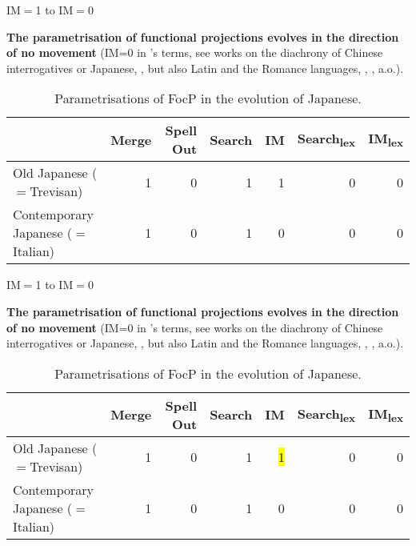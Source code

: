 \documentclass[lesson_slides]{subfiles}
\begin{document}
\begin{frame}[c]{IM$=$1 to IM$=$0}

    \textbf{The parametrisation of functional projections evolves in the direction of no movement} (IM=0 in \citeauthor{rizzi2017}’s \citeyear{rizzi2017} terms, see works on the diachrony of Chinese interrogatives \citealt{aldridge2010clause} or Japanese, \citealt{aldridge2009old}, but also Latin and the Romance languages, \citealt{roberts2003syntactic}, \citealt{dadan2019}, a.o.). \pause
    
    \begin{table}[ht]
        \centering
        \begin{tabular}{|l|r|r|r|r|r|r|}
        \hline
         & Merge & Spell Out & Search & IM & Search\textsubscript{lex} & IM\textsubscript{lex} \\
        \hline
        Old Japanese ($=$Trevisan) & 1 & 0 & 1 & 1 & 0 & 0\\
        \hline
        Contemporary Japanese ($=$Italian) & 1 & 0 & 1 & 0 & 0 & 0 \\
        \hline
        \end{tabular}
        \caption{\label{tab:samp2}Parametrisations of FocP in the evolution of Japanese.}
    \end{table}
    
\end{frame}
\begin{frame}[c]{IM$=$1 to IM$=$0}

\textbf{The parametrisation of functional projections evolves in the direction of no movement} (IM=0 in \citeauthor{rizzi2017}’s \citeyear{rizzi2017} terms, see works on the diachrony of Chinese interrogatives \citealt{aldridge2010clause} or Japanese, \citealt{aldridge2009old}, but also Latin and the Romance languages, \citealt{roberts2003syntactic}, \citealt{dadan2019}, a.o.).

\begin{table}[ht]
    \centering
    \begin{tabular}{|l|r|r|r|r|r|r|}
    \hline
     & Merge & Spell Out & Search & IM & Search\textsubscript{lex} & IM\textsubscript{lex} \\
    \hline
    Old Japanese ($=$Trevisan) & 1 & 0 & 1 & \hl{1} & 0 & 0\\
    \hline
    Contemporary Japanese ($=$Italian) & 1 & 0 & 1 & 0 & 0 & 0 \\
    \hline
    \end{tabular}
    \caption{\label{tab:samp2}Parametrisations of FocP in the evolution of Japanese.}
    \end{table}

\end{frame}
\end{document}

